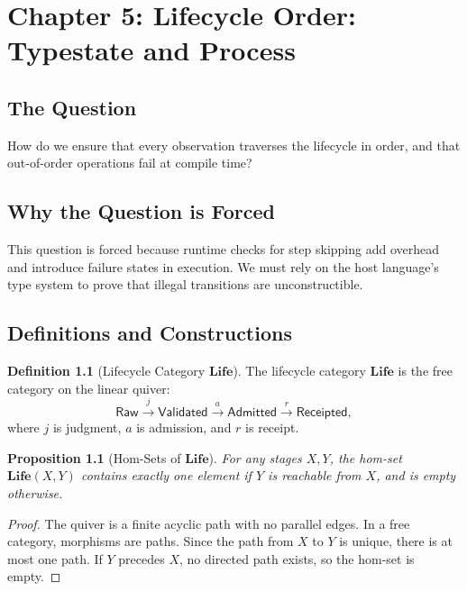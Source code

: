 \documentclass[11pt,oneside]{book}
\theoremstyle{definition}
\newtheorem{definition}{Definition}[chapter]
\theoremstyle{plain}
\newtheorem{proposition}[theorem]{Proposition}
\theoremstyle{remark}
\newcommand{\Raw}{\mathsf{Raw}}
\newcommand{\Val}{\mathsf{Validated}}
\newcommand{\Admd}{\mathsf{Admitted}}
\newcommand{\Rcpt}{\mathsf{Receipted}}
\newcommand{\Life}{\mathbf{Life}}
\begin{document}
\chapter{Chapter 5: Lifecycle Order: Typestate and Process}
\label{ch:lifecycle}

\section{The Question}
How do we ensure that every observation traverses the lifecycle in order, and that out-of-order operations fail at compile time? %

\section{Why the Question is Forced}
This question is forced because runtime checks for step skipping add overhead and introduce failure states in execution. %
We must rely on the host language's type system to prove that illegal transitions are unconstructible. %

\section{Definitions and Constructions}

\begin{definition}[Lifecycle Category $\Life$]\label{def:lifecycle_cat}
The lifecycle category $\Life$ is the free category on the linear quiver:
\[
\Raw \xrightarrow{j} \Val \xrightarrow{a} \Admd \xrightarrow{r} \Rcpt,
\]
where $j$ is judgment, $a$ is admission, and $r$ is receipt. %
\end{definition}

\begin{proposition}[Hom-Sets of $\Life$]\label{prop:hom_sets}
For any stages $X, Y$, the hom-set $\Life(X, Y)$ contains exactly one element if $Y$ is reachable from $X$, and is empty otherwise. %
\end{proposition}

\begin{proof}
The quiver is a finite acyclic path with no parallel edges. %
In a free category, morphisms are paths. %
Since the path from $X$ to $Y$ is unique, there is at most one path. %
If $Y$ precedes $X$, no directed path exists, so the hom-set is empty. %
\end{proof}
\end{document}

